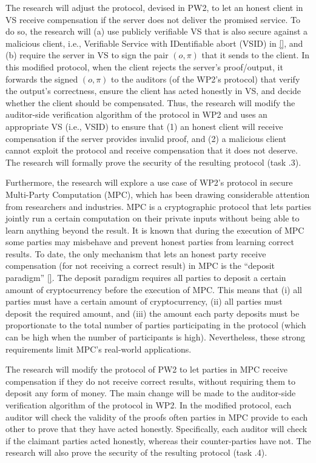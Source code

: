 The research will adjust the protocol, devised in PW2, to let an honest client in VS  receive compensation if the server does not deliver the promised service. To do so, the research will (a) use publicly verifiable VS that is also secure against a malicious client, i.e., Verifiable Service with IDentifiable abort (VSID) in \href{https://arxiv.org/pdf/2208.00283.pdf}{[\printcntr]}, and (b) require the server in VS to sign the pair $(o,\pi)$ that it sends to the client. In this modified protocol, when the client rejects the server's proof/output, it forwards the signed $(o,\pi)$ to the auditors (of the WP2's protocol) that verify the output's correctness, ensure the client has acted honestly in VS, and decide whether the client should be compensated.  Thus, the research will modify the auditor-side verification algorithm of the protocol in WP2 and uses an appropriate VS (i.e., VSID) to ensure that (1) an honest client will receive compensation if the server provides invalid proof, and (2) a malicious client cannot exploit the protocol and receive compensation that it does not deserve. The research will formally prove the security of the resulting protocol (task \4.3). 


 
 Furthermore, the research will explore a use case of WP2's protocol in secure Multi-Party Computation (MPC), which has been drawing considerable attention from researchers and industries. MPC is a cryptographic protocol that lets parties jointly run a certain computation on their private inputs without being able to learn anything beyond the result. It is known that during the execution of MPC some parties may misbehave and prevent honest parties from learning correct results. To date, the only mechanism that lets an honest party receive compensation (for not receiving a correct result) in MPC is the ``deposit paradigm'' \href{https://ieeexplore.ieee.org/stamp/stamp.jsp?tp=&arnumber=6956580}{[\printcntr]}. The deposit paradigm requires all parties to deposit a certain amount of cryptocurrency before the execution of MPC. This means that  (i) all parties must have a certain amount of cryptocurrency, (ii) all parties must deposit the required amount, and (iii) the amount each party deposits must be proportionate to the total number of parties participating in the protocol (which can be high when the number of participants is high). Nevertheless, these strong requirements limit MPC's real-world applications. 
 
The research will modify the protocol of PW2 to let parties in MPC receive compensation if they do not receive correct results,  without requiring them to deposit any form of money. The main change will be made to the auditor-side verification algorithm of the protocol in WP2. In the modified protocol, each auditor will check the validity of the proofs often parties in MPC provide to each other to prove that they have acted honestly. Specifically, each auditor will check if the claimant parties acted honestly, whereas their counter-parties have not. The research will also prove the security of the resulting protocol (task \4.4).
 
